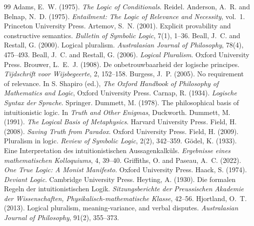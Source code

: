 \documentclass{situationist-preprint}
\begin{document}
\begin{thebibliography}{99}\small
{} Adams, E.~W. (1975). \emph{The Logic of Conditionals}. Reidel.
 Anderson, A.~R. and Belnap, N.~D. (1975). \emph{Entailment: The Logic of Relevance and Necessity}, vol.~1. Princeton University Press.
 Artemov, S.~N. (2001). Explicit provability and constructive semantics. \emph{Bulletin of Symbolic Logic}, 7(1), 1--36.
 Beall, J.~C. and Restall, G. (2000). Logical pluralism. \emph{Australasian Journal of Philosophy}, 78(4), 475--493.
 Beall, J.~C. and Restall, G. (2006). \emph{Logical Pluralism}. Oxford University Press.
 Brouwer, L.~E.~J. (1908). De onbetrouwbaarheid der logische principes. \emph{Tijdschrift voor Wijsbegeerte}, 2, 152--158.
 Burgess, J.~P. (2005). No requirement of relevance. In S. Shapiro (ed.), \emph{The Oxford Handbook of Philosophy of Mathematics and Logic}, Oxford University Press.
 Carnap, R. (1934). \emph{Logische Syntax der Sprache}. Springer.
 Dummett, M. (1978). The philosophical basis of intuitionistic logic. In \emph{Truth and Other Enigmas}, Duckworth.
 Dummett, M. (1991). \emph{The Logical Basis of Metaphysics}. Harvard University Press.
 Field, H. (2008). \emph{Saving Truth from Paradox}. Oxford University Press.
 Field, H. (2009). Pluralism in logic. \emph{Review of Symbolic Logic}, 2(2), 342--359.
 G\"odel, K. (1933). Eine Interpretation des intuitionistischen Aussagenkalk\"uls. \emph{Ergebnisse eines mathematischen Kolloquiums}, 4, 39--40.
 Griffiths, O. and Paseau, A.~C. (2022). \emph{One True Logic: A Monist Manifesto}. Oxford University Press.
 Haack, S. (1974). \emph{Deviant Logic}. Cambridge University Press.
 Heyting, A. (1930). Die formalen Regeln der intuitionistischen Logik. \emph{Sitzungsberichte der Preussischen Akademie der Wissenschaften, Physikalisch-mathematische Klasse}, 42--56.
 Hjortland, O.~T. (2013). Logical pluralism, meaning-variance, and verbal disputes. \emph{Australasian Journal of Philosophy}, 91(2), 355--373.

\end{thebibliography}
\end{document}
